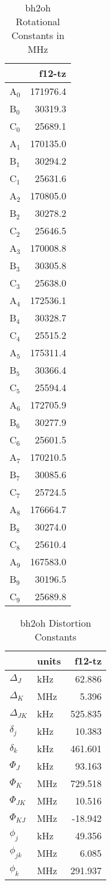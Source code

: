 \begin{table}
\centering
\caption{bh2oh Rotational Constants in MHz}
\label{bh2oh_rots}
\begin{tabular}{lr}
\toprule
 & f12-tz \\
\midrule
A$_0$ & 171976.4 \\
B$_0$ & 30319.3 \\
C$_0$ & 25689.1 \\
A$_1$ & 170135.0 \\
B$_1$ & 30294.2 \\
C$_1$ & 25631.6 \\
A$_2$ & 170805.0 \\
B$_2$ & 30278.2 \\
C$_2$ & 25646.5 \\
A$_3$ & 170008.8 \\
B$_3$ & 30305.8 \\
C$_3$ & 25638.0 \\
A$_4$ & 172536.1 \\
B$_4$ & 30328.7 \\
C$_4$ & 25515.2 \\
A$_5$ & 175311.4 \\
B$_5$ & 30366.4 \\
C$_5$ & 25594.4 \\
A$_6$ & 172705.9 \\
B$_6$ & 30277.9 \\
C$_6$ & 25601.5 \\
A$_7$ & 170210.5 \\
B$_7$ & 30085.6 \\
C$_7$ & 25724.5 \\
A$_8$ & 176664.7 \\
B$_8$ & 30274.0 \\
C$_8$ & 25610.4 \\
A$_9$ & 167583.0 \\
B$_9$ & 30196.5 \\
C$_9$ & 25689.8 \\
\bottomrule
\end{tabular}
\end{table}
\begin{table}
\centering
\caption{bh2oh Distortion Constants}
\label{bh2oh_dis}
\begin{tabular}{llr}
\toprule
 & units & f12-tz \\
\midrule
$\Delta_J$ & kHz & 62.886 \\
$\Delta_K$ & MHz & 5.396 \\
$\Delta_{JK}$ & kHz & 525.835 \\
$\delta_j$ & kHz & 10.383 \\
$\delta_k$ & kHz & 461.601 \\
$\Phi_J$ & kHz & 93.163 \\
$\Phi_K$ & MHz & 729.518 \\
$\Phi_{JK}$ & MHz & 10.516 \\
$\Phi_{KJ}$ & MHz & -18.942 \\
$\phi_j$ & kHz & 49.356 \\
$\phi_{jk}$ & MHz & 6.085 \\
$\phi_k$ & MHz & 291.937 \\
\bottomrule
\end{tabular}
\end{table}
